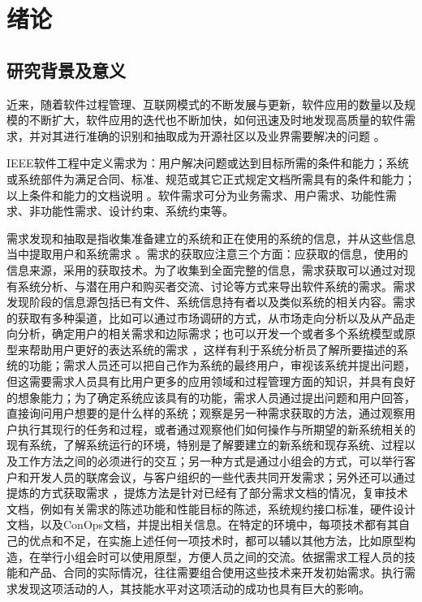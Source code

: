 \chapter{绪论}\label{chap:introduction}

\section{研究背景及意义}

近来，随着软件过程管理、互联网模式的不断发展与更新，软件应用的数量以及规模的不断扩大，软件应用的迭代也不断加快，如何迅速及时地发现高质量的软件需求，并对其进行准确的识别和抽取成为开源社区以及业界需要解决的问题 \cite{Saur2006Review}。


IEEE软件工程中定义需求为：用户解决问题或达到目标所需的条件和能力；系统或系统部件为满足合同、标准、规范或其它正式规定文档所需具有的条件和能力；以上条件和能力的文档说明 \cite{Board2002IEEE}。软件需求可分为业务需求、用户需求、功能性需求、非功能性需求、设计约束、系统约束等。


需求发现和抽取是指收集准备建立的系统和正在使用的系统的信息，并从这些信息当中提取用户和系统需求 \cite{Vlas2011A}。需求的获取应注意三个方面：应获取的信息，使用的信息来源，采用的获取技术。为了收集到全面完整的信息，需求获取可以通过对现有系统分析、与潜在用户和购买者交流、讨论等方式来导出软件系统的需求。需求发现阶段的信息源包括已有文件、系统信息持有者以及类似系统的相关内容。需求的获取有多种渠道，比如可以通过市场调研的方式，从市场走向分析以及从产品走向分析，确定用户的相关需求和边际需求；也可以开发一个或者多个系统模型或原型来帮助用户更好的表达系统的需求 \cite{唐中君基于}，这样有利于系统分析员了解所要描述的系统的功能；需求人员还可以把自己作为系统的最终用户，审视该系统并提出问题，但这需要需求人员具有比用户更多的应用领域和过程管理方面的知识，并具有良好的想象能力；为了确定系统应该具有的功能，需求人员通过提出问题和用户回答，直接询问用户想要的是什么样的系统；观察是另一种需求获取的方法，通过观察用户执行其现行的任务和过程，或者通过观察他们如何操作与所期望的新系统相关的现有系统，了解系统运行的环境，特别是了解要建立的新系统和现存系统、过程以及工作方法之间的必须进行的交互；另一种方式是通过小组会的方式，可以举行客户和开发人员的联席会议，与客户组织的一些代表共同开发需求；另外还可以通过提炼的方式获取需求 \cite{孙挺2002基于}，提炼方法是针对已经有了部分需求文档的情况，复审技术文档，例如有关需求的陈述功能和性能目标的陈述，系统规约接口标准，硬件设计文档，以及ConOps文档，并提出相关信息。在特定的环境中，每项技术都有其自己的优点和不足，在实施上述任何一项技术时，都可以辅以其他方法，比如原型构造，在举行小组会时可以使用原型，方便人员之间的交流。依据需求工程人员的技能和产品、合同的实际情况，往往需要组合使用这些技术来开发初始需求。执行需求发现这项活动的人，其技能水平对这项活动的成功也具有巨大的影响。

